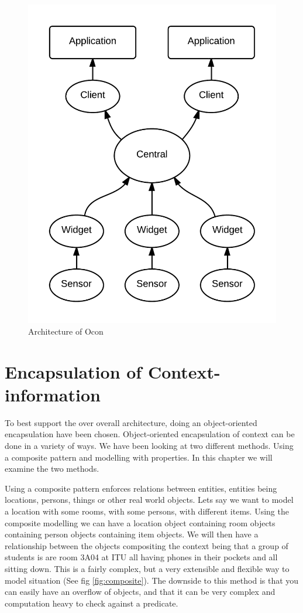 \documentclass[../report.tex]{subfiles}
\begin{document}
\begin{figure}[H]
\centering
\includegraphics[scale=0.2]{grandarchitecture.png}
\caption{Architecture of Ocon}
\label{fig:GrandArchitecture}
\end{figure}

\section{Encapsulation of Context-information}

To best support the over overall architecture, doing an object-oriented encapsulation have been chosen. Object-oriented encapsulation of context can be done in a variety of ways. We have been looking at two different methods. Using a composite pattern and modelling with properties. In this chapter we will examine the two methods.

Using a composite pattern enforces relations between entities, entities being locations, persons, things or other real world objects. Lets say we want to model a location with some rooms, with some persons, with different items. Using the composite modelling we can have a location object containing room objects containing person objects containing item objects. We will then have a relationship between the objects compositing the context being that a group of students is are room 3A04 at ITU all having phones in their pockets and all sitting down. This is a fairly complex, but a very extensible and flexible way to model situation (See fig \ref{fig:composite}). The downside to this method is that you can easily have an overflow of objects, and that it can be very complex and computation heavy to check against a predicate.
\end{document}
